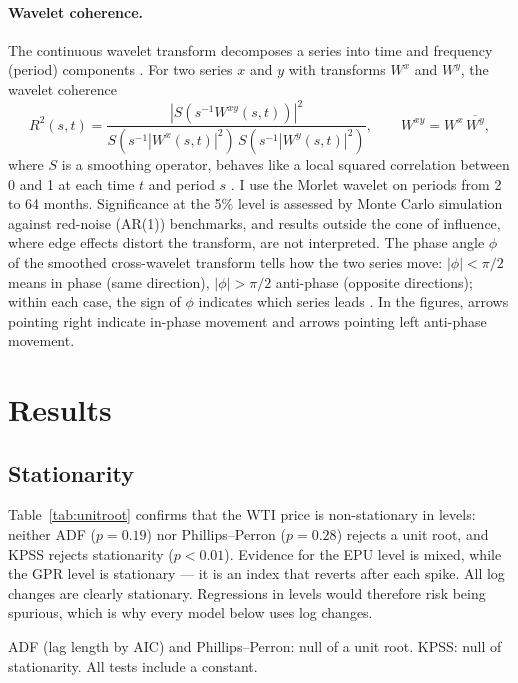 \documentclass[11pt,a4paper]{article}
\begin{document}
\paragraph{Wavelet coherence.}\label{sec:wavelet} The continuous wavelet
transform decomposes a series into time and frequency (period) components
\citep{torrence1998}. For two series $x$ and $y$ with transforms $W^x$ and $W^y$,
the wavelet coherence
\begin{equation}
R^2(s,t)=\frac{\left|S\!\left(s^{-1}W^{xy}(s,t)\right)\right|^2}
{S\!\left(s^{-1}|W^{x}(s,t)|^2\right)\,S\!\left(s^{-1}|W^{y}(s,t)|^2\right)},
\qquad W^{xy}=W^{x}\,\overline{W^{y}},
\end{equation}
where $S$ is a smoothing operator, behaves like a local squared correlation
between 0 and 1 at each time $t$ and period $s$ \citep{grinsted2004}. I use the
Morlet wavelet on periods from 2 to 64 months. Significance at the 5\% level is
assessed by Monte Carlo simulation against red-noise (AR(1)) benchmarks, and
results outside the cone of influence, where edge effects distort the transform,
are not interpreted. The phase angle $\phi$ of the smoothed cross-wavelet
transform tells how the two series move: $|\phi|<\pi/2$ means in phase (same
direction), $|\phi|>\pi/2$ anti-phase (opposite directions); within each case, the
sign of $\phi$ indicates which series leads \citep{aguiar2014}. In the figures,
arrows pointing right indicate in-phase movement and arrows pointing left
anti-phase movement.

\section{Results}\label{sec:results}

\subsection{Stationarity}

Table~\ref{tab:unitroot} confirms that the WTI price is non-stationary in levels:
neither ADF ($p=0.19$) nor Phillips--Perron ($p=0.28$) rejects a unit root, and
KPSS rejects stationarity ($p<0.01$). Evidence for the EPU level is mixed, while
the GPR level is stationary --- it is an index that reverts after each spike. All
log changes are clearly stationary. Regressions in levels would therefore risk
being spurious, which is why every model below uses log changes.

\begin{table}[H]
\centering
\caption{Unit-root and stationarity tests}
\label{tab:unitroot}
\begin{small}

\end{small}
\par\smallskip\parbox{0.92\textwidth}{\footnotesize ADF (lag length by AIC) and
Phillips--Perron: null of a unit root. KPSS: null of stationarity. All tests
include a constant.}
\end{table}
\end{document}
